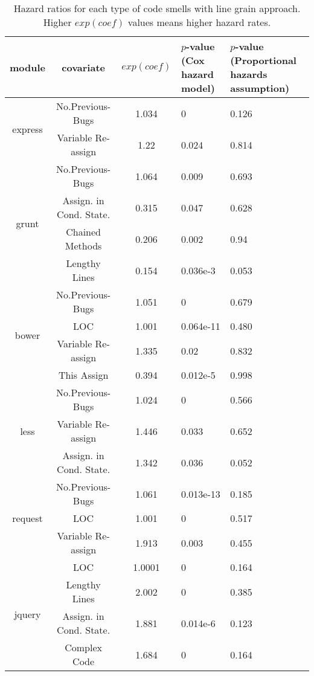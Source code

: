 \begin{table}[t]
	\centering
	\scriptsize
	\caption{Hazard ratios for each type of code smells with line grain approach. Higher $exp(coef)$ values means higher hazard rates.}
	\begin{tabular}{c|c|c|p{1.1cm}|p{1.3cm}}
		\hline
		module & covariate & $exp(coef)$ & $p$-value (Cox hazard model) & $p$-value (Proportional hazards assumption) \\ \hline
		\multirow{2}{*}{express}
		& No.Previous-Bugs & 1.034 & 0 & 0.126 \\ \cline{2-5}
		& Variable Re-assign & 1.22 & 0.024 & 0.814  \\ \hline
		\multirow{4}{*}{grunt} 
		& No.Previous-Bugs & 1.064 & 0.009 & 0.693 \\ \cline{2-5}
		& Assign. in Cond. State. & 0.315 & 0.047 & 0.628 \\ \cline{2-5}
		& Chained Methods & 0.206 & 0.002 & 0.94 \\ \cline{2-5}
		& Lengthy Lines & 0.154 & 0.036e-3 & 0.053 \\ \hline
		\multirow{4}{*}{bower}
		& No.Previous-Bugs & 1.051 & 0 & 0.679 \\ \cline{2-5}
		& LOC & 1.001 & 0.064e-11 & 0.480 \\ \cline{2-5}
		& Variable Re-assign & 1.335 & 0.02 & 0.832 \\ \cline{2-5}
		& This Assign & 0.394 & 0.012e-5 & 0.998 \\ \hline
		\multirow{3}{*}{less}
		& No.Previous-Bugs & 1.024 & 0 & 0.566 \\ \cline{2-5}
		& Variable Re-assign & 1.446 & 0.033 & 0.652 \\ \cline{2-5}
		& Assign. in Cond. State. & 1.342 & 0.036 & 0.052 \\ \hline
		\multirow{3}{*}{request}
		& No.Previous-Bugs & 1.061 & 0.013e-13 & 0.185 \\ \cline{2-5}
		& LOC & 1.001 & 0 & 0.517 \\ \cline{2-5}
		& Variable Re-assign & 1.913 & 0.003 & 0.455 \\ \hline
		\multirow{4}{*}{jquery}
		& LOC & 1.0001 & 0 & 0.164 \\ \cline{2-5}
		& Lengthy Lines & 2.002 & 0 & 0.385 \\ \cline{2-5}
		& Assign. in Cond. State. & 1.881 & 0.014e-6 & 0.123 \\ \cline{2-5}
		& Complex Code & 1.684 & 0 & 0.164 \\ \hline

\end{tabular}
\end{table}
